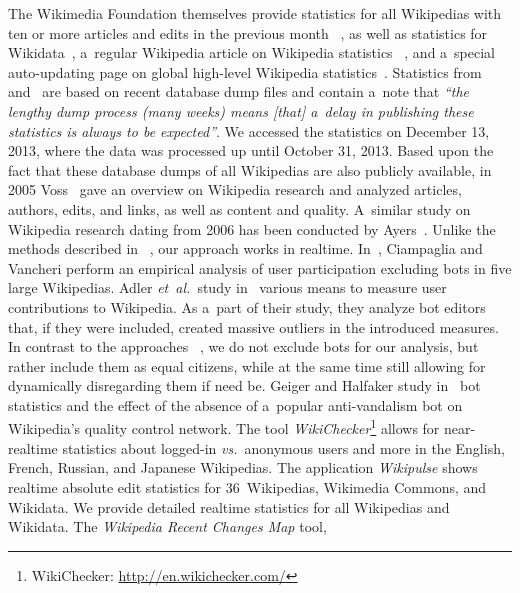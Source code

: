 \documentclass{sig-alternate}
\newcommand{\inlinelistingsize}{\fontsize{8pt}{11pt}}
\let\oldurl\url
\renewcommand{\url}[1]{\inlinelistingsize\oldurl{#1}}
\begin{document}
The Wikimedia Foundation themselves provide
statistics for all Wikipedias
with ten or more articles and edits in the previous month%
~\cite{zachte2013wikipedia},
as well as statistics for Wikidata~\cite{zachte2013wikidata},
a~regular Wikipedia article on Wikipedia statistics%
~\cite{wikipedia2013stats},
and a~special auto-updating page on global high-level
Wikipedia statistics~\cite{wikipedia2013special}.
Statistics from~\cite{zachte2013wikidata} and~\cite{zachte2013wikipedia}
are based on recent database dump files
and contain a~note that \textit{``the lengthy dump process
(many weeks) means [that] a~delay in publishing these statistics
is always to be expected''}.
We accessed the statistics on December 13, 2013,
where the data was processed up until October 31, 2013.
Based upon the fact that these database dumps
of all Wikipedias are also publicly available,
in 2005 Voss~\cite{voss2005measuring} gave 
an overview on Wikipedia research
and analyzed articles, authors, edits, and links,
as well as content and quality.
A~similar study on Wikipedia research dating from 2006
has been conducted by Ayers~\cite{ayers2006researchingwikipedia}.
Unlike the methods described in~%
\cite{ayers2006researchingwikipedia,voss2005measuring,zachte2013wikidata,zachte2013wikipedia},
our approach works in realtime.
In~\cite{ciampaglia2010empiricalanalysis}, Ciampaglia and Vancheri
perform an empirical analysis of user participation
excluding bots in five large Wikipedias.
Adler \emph{et~al.}\ study in~\cite{adler2008measuringauthor}
various means to measure user contributions to Wikipedia.
As a~part of their study, they analyze bot editors
that, if they were included, created massive outliers
in the introduced measures.
In contrast to the approaches%
~\cite{adler2008measuringauthor,ciampaglia2010empiricalanalysis},
we do not exclude bots for our analysis,
but rather include them as equal citizens,
while at the same time still allowing for dynamically
disregarding them if need be.
Geiger and Halfaker study in~\cite{geiger2013withoutbots}
bot statistics and the effect
of the absence of a~popular anti-vandalism bot
on Wikipedia's quality control network.
The tool \emph{WikiChecker}\footnote{WikiChecker:
\url{http://en.wikichecker.com/}}
allows for near-realtime statistics
about logged-in \emph{vs.}\ anonymous users and more in
the English, French, Russian, and Japanese Wikipedias.
The application \emph{Wikipulse} shows realtime absolute
edit statistics for 36~Wikipedias, Wikimedia Commons, and Wikidata.
We provide detailed realtime statistics for all Wikipedias and Wikidata.
The \emph{Wikipedia Recent Changes Map} tool,
\end{document}
